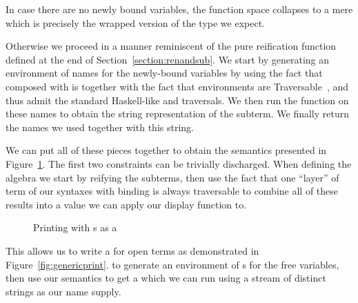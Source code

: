 \begin{agdasnippet}
\end{agdasnippet}

In case there are no newly bound variables, the  function space
collapses to a mere  which is precisely the wrapped version of
the type we expect.

\begin{agdasnippet}
\end{agdasnippet}

Otherwise we proceed in a manner reminiscent of the pure reification function
defined at the end of Section~\ref{section:renandsub}. We start by generating an environment
of names for the newly-bound variables by using the fact that  composed
with  is  together with the fact that environments are
Traversable~\cite{mcbride_paterson_2008}, %
and thus admit the standard Haskell-like  and 
traversals. %
We then run the  function
on these names to obtain the string representation of the subterm. We finally
return the names we used together with this string.

\begin{agdasnippet}
\end{agdasnippet}

We can put all of these pieces together to obtain the  semantics
presented in Figure~\ref{fig:genericprinting}.
The first two constraints can be trivially discharged. When defining the
algebra we start by reifying the subterms, then use the fact that  one ``layer''
of term of our syntaxes with binding is always traversable to combine all of
these results into a value we can apply our display function to.

\begin{figure}[h]
\caption{Printing with s as a }\label{fig:genericprinting}
\end{figure}

This allows us to write a  for open terms as demonstrated in
Figure~\ref{fig:genericprint}.
to generate an environment of s for the free variables, then use
our semantics to get a  which we can run using a stream  of distinct
strings as our name supply.

